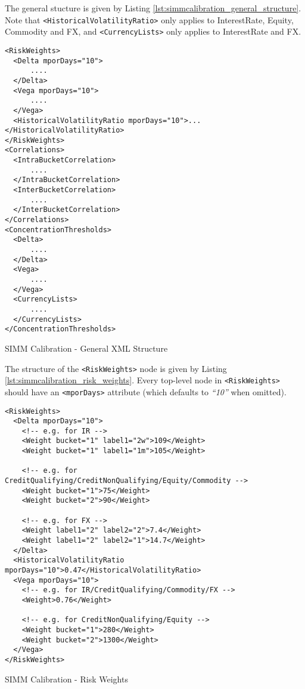 The general stucture is given by Listing \ref{lst:simmcalibration_general_structure}. Note that
{\tt <HistoricalVolatilityRatio>} only applies to InterestRate, Equity, Commodity and FX, and
{\tt <CurrencyLists>} only applies to InterestRate and FX.

\begin{listing}[H]
\begin{verbatim}
<RiskWeights>
  <Delta mporDays="10">
      ....
  </Delta>
  <Vega mporDays="10">
      ....
  </Vega>
  <HistoricalVolatilityRatio mporDays="10">...</HistoricalVolatilityRatio>
</RiskWeights>
<Correlations>
  <IntraBucketCorrelation>
      ....
  </IntraBucketCorrelation>
  <InterBucketCorrelation>
      ....
  </InterBucketCorrelation>
</Correlations>
<ConcentrationThresholds>
  <Delta>
      ....
  </Delta>
  <Vega>
      ....
  </Vega>
  <CurrencyLists>
      ....
  </CurrencyLists>
</ConcentrationThresholds>
\end{verbatim}
\caption{SIMM Calibration - General XML Structure}
\label{lst:simmcalibration_general_structure}
\end{listing}

The structure of the {\tt <RiskWeights>} node is given by Listing \ref{lst:simmcalibration_risk_weights}.
Every top-level node in {\tt <RiskWeights>} should have an {\tt <mporDays>} attribute (which defaults to
\emph{``10''} when omitted).

\begin{listing}[H]
\begin{verbatim}
<RiskWeights>
  <Delta mporDays="10">
    <!-- e.g. for IR -->
    <Weight bucket="1" label1="2w">109</Weight>
    <Weight bucket="1" label1="1m">105</Weight>

    <!-- e.g. for CreditQualifying/CreditNonQualifying/Equity/Commodity -->
    <Weight bucket="1">75</Weight>
    <Weight bucket="2">90</Weight>

    <!-- e.g. for FX -->
    <Weight label1="2" label2="2">7.4</Weight>
    <Weight label1="2" label2="1">14.7</Weight>
  </Delta>
  <HistoricalVolatilityRatio mporDays="10">0.47</HistoricalVolatilityRatio>
  <Vega mporDays="10">
    <!-- e.g. for IR/CreditQualifying/Commodity/FX -->
    <Weight>0.76</Weight>

    <!-- e.g. for CreditNonQualifying/Equity -->
    <Weight bucket="1">280</Weight>
    <Weight bucket="2">1300</Weight>
  </Vega>
</RiskWeights>
\end{verbatim}
\caption{SIMM Calibration - Risk Weights}
\label{lst:simmcalibration_risk_weights}
\end{listing}

